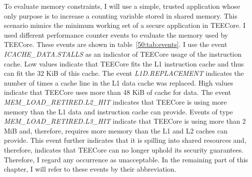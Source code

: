 To evaluate memory constraints, I will use a simple, trusted application whose
only purpose is to increase a counting variable stored in shared memory. This
scenario mimics the minimum working set of a secure application in TEECore. I
used different performance counter events to evaluate the memory used by
TEECore. These events are shown in table~\ref{50:tab:events}. I use the event
\textit{ICACHE\_DATA.STALLS} as an indicator of TEECore usage of the instruction
cache. Low values indicate that TEECore fits the L1 instruction cache and thus
can fit the 32 KiB of this cache. The event \textit{L1D.REPLACEMENT} indicates
the number of times a cache line in the L1 data cache was replaced. High values
indicate that TEECore uses more than 48 KiB of cache for data. The event
\textit{MEM\_LOAD\_RETIRED.L2\_HIT} indicates that TEECore is using more memory
than the L1 data and instruction cache can provide. Events of type
\textit{MEM\_LOAD\_RETIRED.L3\_HIT} indicate that TEECore is using more than 2
MiB and, therefore, requires more memory than the L1 and L2 caches can provide.
This event further indicates that it is spilling into shared resources and,
therefore, indicates that TEECore can no longer uphold its security guarantees.
Therefore, I regard any occurrence as unacceptable. In the remaining part of
this chapter, I will refer to these events by their abbreviation.

